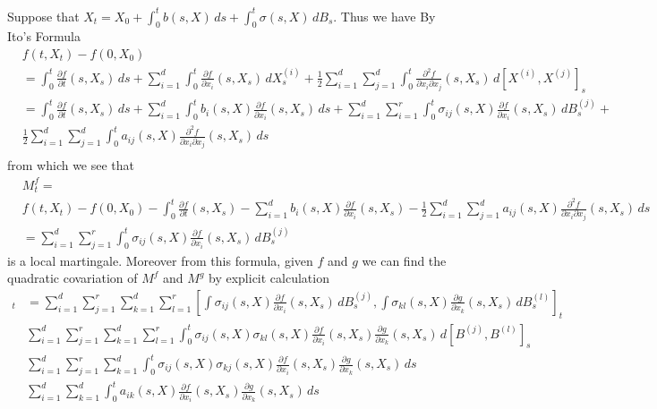 Suppose that $X_t = X_0 + \int_0^t b(s,X) \, ds + \int_0^t \sigma(s,X) \, dB_s$.  Thus we have By Ito's Formula
\begin{align*}
&f(t, X_t) - f(0, X_0) \\
&= \int_0^t \frac{\partial f}{\partial t} (s,X_s) \, ds + \sum_{i=1}^d \int_0^t \frac{\partial f}{\partial x_i} (s,X_s) \, dX^{(i)}_s + \frac{1}{2} \sum_{i=1}^d \sum_{j=1}^d \int_0^t \frac{\partial^2 f}{\partial x_i \partial x_j} (s, X_s) \, d[X^{(i)},X^{(j)}]_s \\
&= \int_0^t \frac{\partial f}{\partial t} (s,X_s) \, ds + \sum_{i=1}^d \int_0^t b_i(s,X) \frac{\partial f}{\partial x_i} (s,X_s) \, ds + \sum_{i=1}^d \sum_{i=1}^r \int_0^t \sigma_{ij}(s,X) \frac{\partial f}{\partial x_i} (s,X_s) \, dB^{(j)}_s+ \\
&\frac{1}{2} \sum_{i=1}^d \sum_{j=1}^d \int_0^t a_{ij}(s,X) \frac{\partial^2 f}{\partial x_i \partial x_j} (s, X_s) \, ds \\
\end{align*}
from which we see that 
\begin{align*}
&M^f_t = \\
&f(t, X_t) - f(0, X_0) - \int_0^t \frac{\partial f}{\partial t} (s,X_s) - \sum_{i=1}^d b_i(s,X) \frac{\partial f}{\partial x_i} (s,X_s)  - \frac{1}{2} \sum_{i=1}^d \sum_{j=1}^d a_{ij}(s,X) \frac{\partial^2 f}{\partial x_i \partial x_j} (s, X_s) \, ds \\
&=\sum_{i=1}^d \sum_{j=1}^r \int_0^t \sigma_{ij}(s,X) \frac{\partial f}{\partial x_i} (s,X_s) \, dB^{(j)}_s
\end{align*}
is a local martingale.  Moreover from this formula, given $f$ and $g$ we can find the quadratic covariation of $M^f$ and $M^g$ by explicit calculation
\begin{align*}
[M^f,M^g]_t &= \sum_{i=1}^d \sum_{j=1}^r \sum_{k=1}^d \sum_{l=1}^r [\int \sigma_{ij}(s,X) \frac{\partial f}{\partial x_i} (s,X_s) \, dB^{(j)}_s, \int \sigma_{kl}(s,X) \frac{\partial g}{\partial x_k} (s,X_s) \, dB^{(l)}_s]_t \\
&\sum_{i=1}^d \sum_{j=1}^r \sum_{k=1}^d \sum_{l=1}^r \int_0^t \sigma_{ij}(s,X) \sigma_{kl}(s,X) \frac{\partial f}{\partial x_i} (s,X_s) \frac{\partial g}{\partial x_k} (s,X_s) \, d[ B^{(j)}, B^{(l)}]_s \\
&\sum_{i=1}^d \sum_{j=1}^r \sum_{k=1}^d \int_0^t \sigma_{ij}(s,X) \sigma_{kj}(s,X) \frac{\partial f}{\partial x_i} (s,X_s) \frac{\partial g}{\partial x_k} (s,X_s) \, ds \\
&\sum_{i=1}^d \sum_{k=1}^d \int_0^t a_{ik}(s,X) \frac{\partial f}{\partial x_i} (s,X_s) \frac{\partial g}{\partial x_k} (s,X_s) \, ds \\
\end{align*}

